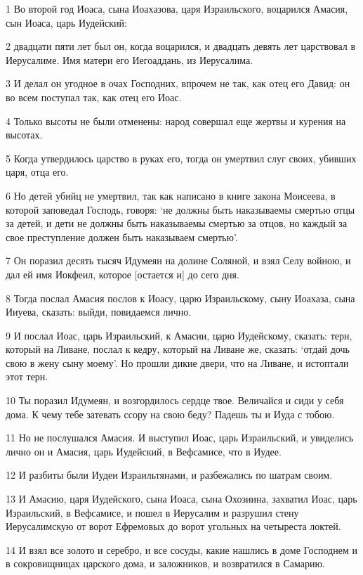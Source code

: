 \par 1 Во второй год Иоаса, сына Иоахазова, царя Израильского, воцарился Амасия, сын Иоаса, царь Иудейский:
\par 2 двадцати пяти лет был он, когда воцарился, и двадцать девять лет царствовал в Иерусалиме. Имя матери его Иегоаддань, из Иерусалима.
\par 3 И делал он угодное в очах Господних, впрочем не так, как отец его Давид: он во всем поступал так, как отец его Иоас.
\par 4 Только высоты не были отменены: народ совершал еще жертвы и курения на высотах.
\par 5 Когда утвердилось царство в руках его, тогда он умертвил слуг своих, убивших царя, отца его.
\par 6 Но детей убийц не умертвил, так как написано в книге закона Моисеева, в которой заповедал Господь, говоря: `не должны быть наказываемы смертью отцы за детей, и дети не должны быть наказываемы смертью за отцов, но каждый за свое преступление должен быть наказываем смертью'.
\par 7 Он поразил десять тысяч Идумеян на долине Соляной, и взял Селу войною, и дал ей имя Иокфеил, которое [остается и] до сего дня.
\par 8 Тогда послал Амасия послов к Иоасу, царю Израильскому, сыну Иоахаза, сына Ииуева, сказать: выйди, повидаемся лично.
\par 9 И послал Иоас, царь Израильский, к Амасии, царю Иудейскому, сказать: терн, который на Ливане, послал к кедру, который на Ливане же, сказать: `отдай дочь свою в жену сыну моему'. Но прошли дикие двери, что на Ливане, и истоптали этот терн.
\par 10 Ты поразил Идумеян, и возгордилось сердце твое. Величайся и сиди у себя дома. К чему тебе затевать ссору на свою беду? Падешь ты и Иуда с тобою.
\par 11 Но не послушался Амасия. И выступил Иоас, царь Израильский, и увиделись лично он и Амасия, царь Иудейский, в Вефсамисе, что в Иудее.
\par 12 И разбиты были Иудеи Израильтянами, и разбежались по шатрам своим.
\par 13 И Амасию, царя Иудейского, сына Иоаса, сына Охозиина, захватил Иоас, царь Израильский, в Вефсамисе, и пошел в Иерусалим и разрушил стену Иерусалимскую от ворот Ефремовых до ворот угольных на четыреста локтей.
\par 14 И взял все золото и серебро, и все сосуды, какие нашлись в доме Господнем и в сокровищницах царского дома, и заложников, и возвратился в Самарию.
